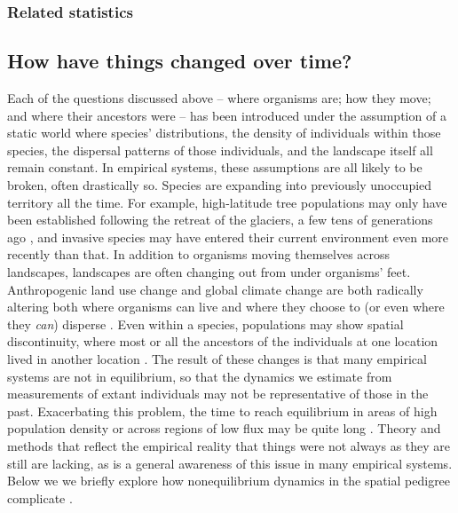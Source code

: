 \documentclass{ar-1col}
\newcommand{\g}[1]{{\color{blue}{#1}}}
\newcommand{\todo}[1]{{\textbf{\color{red}{#1}}}}
\begin{document}
\subsubsection{Related statistics}

\todo{Fst, various IBD-metrics???}


\subsection{How have things changed over time?}

Each of the questions discussed above --
where organisms are;
how they move;
and where their ancestors were
-- has been introduced under the assumption of a static world
where species' distributions,
the density of individuals within those species,
the dispersal patterns of those individuals,
and the landscape itself all remain constant.
In empirical systems,
these assumptions are all likely to be broken,
often drastically so.
Species are expanding into previously unoccupied territory all the time.
For example, 
high-latitude tree populations may only have been established
following the retreat of the glaciers,
a few tens of generations ago \citep{WhitlockMcCauley1999},
and invasive species may have entered their current
environment even more recently than that.
In addition to organisms moving themselves across landscapes,
landscapes are often changing out from under organisms' feet.
Anthropogenic land use change
and global climate change
are both radically altering both where organisms can live
and where they choose to
(or even where they \textit{can}) disperse \citep{parmesan1999}.
Even within a species,
populations may show spatial discontinuity,
where most or all the ancestors of the individuals at one location
lived in another location 
\citep{bi2013unlocking,skoglund2014investigating,lazaridis_ancient_2014, joseph2018inference}.
The result of these changes is that many empirical systems
are not in equilibrium,
so that the dynamics we estimate from
measurements of extant individuals may
not be representative of those in the past.
Exacerbating this problem,
the time to reach equilibrium
in areas of high population density
or across regions of low flux
may be quite long
\citep{CrowAoki1984group, whitlock1992temporal, slatkin1993isolation, WhitlockMcCauley1999}.
Theory and methods that
reflect the empirical reality that things were not always as they are
still are lacking, 
as is a general awareness of this issue in many empirical systems.
Below we we briefly explore how nonequilibrium dynamics
in the spatial pedigree complicate \g{inference}.
\end{document}
